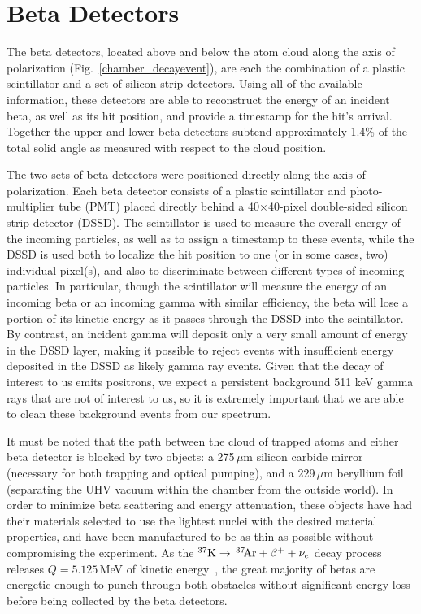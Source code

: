 {
	\pagebreak
}
{}
\section{Beta Detectors}
\label{section:betadetectors}
The beta detectors, located above and below the atom cloud along the axis of polarization (Fig.~\ref{chamber_decayevent}), are each the combination of a plastic scintillator and a set of silicon strip detectors.  Using all of the available information, these detectors are able to reconstruct the energy of an incident beta, as well as its hit position, and provide a timestamp for the hit's arrival.  Together the upper and lower beta detectors subtend approximately 1.4\% of the total solid angle as measured with respect to the cloud position. 

	The two sets of beta detectors were positioned directly along the axis of polarization.  Each beta detector consists of a plastic scintillator and photo-multiplier tube (PMT)  placed directly behind a 40$\times$40-pixel double-sided silicon strip detector (DSSD).    The scintillator is used to measure the overall energy of the incoming particles, as well as to assign a timestamp to these events, while the DSSD is used both to localize the hit position to one (or in some cases, two) individual pixel(s), and also to discriminate between different types of incoming particles.  In particular, though the scintillator will measure the energy of an incoming beta or an incoming gamma with similar efficiency, the beta will lose a portion of its kinetic energy as it passes through the DSSD into the scintillator.  By contrast, an incident gamma will deposit only a very small amount of energy in the DSSD layer, making it possible to reject events with insufficient energy deposited in the DSSD as likely gamma ray events.  Given that the decay of interest to us emits positrons, we expect a persistent background 511 keV gamma rays that are not of interest to us, so it is extremely important that we are able to clean these background events from our spectrum. 


It must be noted that the path between the cloud of trapped atoms and either beta detector is blocked by two objects:  a 275$\,\mu$m silicon carbide mirror (necessary for both trapping and optical pumping), and a 229$\,\mu$m beryllium foil (separating the UHV vacuum within the chamber from the outside world).  In order to minimize beta scattering and energy attenuation, these objects have had their materials selected to use the lightest nuclei with the desired material properties, and have been manufactured to be as thin as possible without compromising the experiment.  As the $^{37}\textrm{K} \rightarrow \,^{37}\textrm{\!Ar} + \beta^{+} + \nu_e$ decay process releases $Q=5.125$\,MeV of kinetic energy~\cite{Q_value}, the great majority of betas are energetic enough to punch through both obstacles without significant energy loss before being collected by the beta detectors.  




